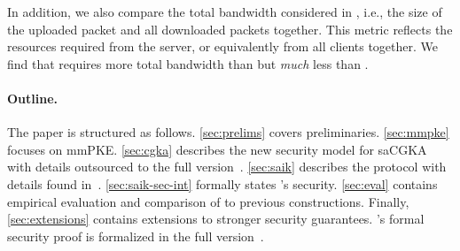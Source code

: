 In addition, we also compare the total bandwidth considered in \cite{hashimoto2021cmpke}, i.e., the size of the uploaded packet and all downloaded packets together. This metric reflects the resources required from the server, or equivalently from all clients together. We find that \saik requires more total bandwidth than \protCMPKE but \emph{much} less than \protITK.


%



\paragraph{Outline.}
The paper is structured as follows. \cref{sec:prelims}
covers preliminaries. \cref{sec:mmpke}
focuses on mmPKE. \cref{sec:cgka} describes the new security model for
saCGKA with details outsourced to the full version~\cite{EPRINT:AHKM21}. \cref{sec:saik} describes the \saik protocol with details found in~\cite{EPRINT:AHKM21}. \cref{sec:saik-sec-int} formally states \saik's security. \cref{sec:eval} contains empirical
evaluation and comparison of \saik to previous constructions. Finally, \cref{sec:extensions} contains extensions
to stronger security guarantees. \saik's formal security proof is formalized in the full version~\cite{EPRINT:AHKM21}.



